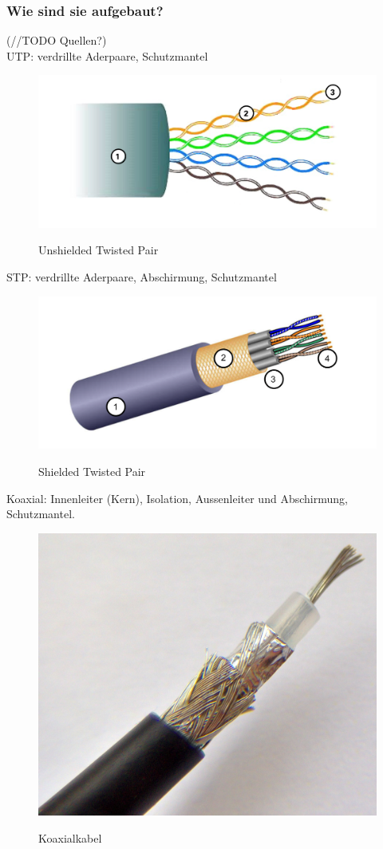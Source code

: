 \subsubsection*{Wie sind sie aufgebaut?}
(//TODO Quellen?)\\
    UTP: verdrillte Aderpaare, Schutzmantel
    \begin{figure}[H]
        \begin{center}
            \label{pic:UTP}
            \includegraphics[width=.5\textwidth]{images/UTP.png}
            \caption{Unshielded Twisted Pair}
        \end{center}
    \end{figure}

    STP: verdrillte Aderpaare, Abschirmung, Schutzmantel
    \begin{figure}[H]
        \begin{center}
            \label{pic:STP}
            \includegraphics[width=.5\textwidth]{images/STP.png}
            \caption{Shielded Twisted Pair}
        \end{center}
    \end{figure}
    Koaxial: Innenleiter (Kern), Isolation, Aussenleiter und Abschirmung, Schutzmantel.
    \begin{figure}[H]
        \begin{center}
            \label{pic:Coaxial}
            \includegraphics[width=.5\textwidth]{images/Coaxial_cable_cut.jpg}
            \caption{Koaxialkabel\cite{wiki}}
        \end{center}
    \end{figure}

